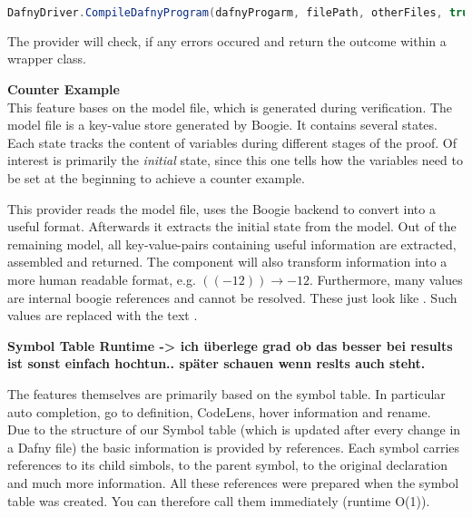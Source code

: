 \begin{lstlisting}[language=csharp, caption={Calling the Dafny Compiler}, captionpos=b, label={lst:dafnycompiler}]
DafnyDriver.CompileDafnyProgram(dafnyProgarm, filePath, otherFiles, true, textwriter);
\end{lstlisting}

The provider will check, if any errors occured and return the outcome within a wrapper class.

\textbf{Counter Example}\\
This feature bases on the model file, which is generated during verification. The model file is a key-value store generated by Boogie. It contains several states. Each state tracks the content of variables during different stages of the proof. Of interest is primarily the \textit{initial} state, since this one tells how the variables need to be set at the beginning to achieve a counter example.

This provider reads the model file, uses the Boogie backend to convert into a useful format. Afterwards it extracts the initial state from the model. Out of the remaining model, all key-value-pairs containing useful information are extracted, assembled and returned. The component will also transform information into a more human readable format, e.g. $((- 12)) \rightarrow -12$. Furthermore, many values are internal boogie references and cannot be resolved. These just look like . Such values are replaced with the text .











\textbf{Symbol Table Runtime -> ich überlege grad ob das besser bei results ist sonst einfach hochtun.. später schauen wenn reslts auch steht.}

The features themselves are primarily based on the symbol table.
In particular auto completion, go to definition, CodeLens, hover information and rename. \\

Due to the structure of our Symbol table (which is updated after every change in a Dafny file)
the basic information is provided by references.
Each symbol carries references to its child simbols, to the parent symbol, to the original declaration and much more information.
All these references were prepared when the symbol table was created. You can therefore call them immediately (runtime O(1)).  

